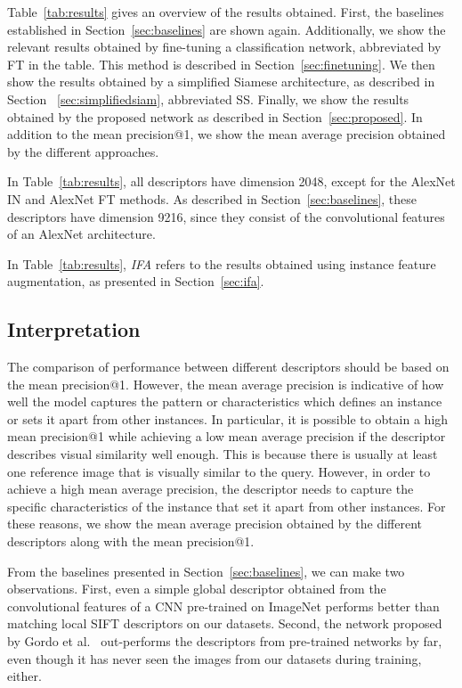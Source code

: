 Table~\ref{tab:results} gives an overview of the results obtained. First,
the baselines established in Section~\ref{sec:baselines} are shown
again. Additionally, we show the relevant results obtained by fine-tuning
a classification network, abbreviated by FT in the table. This method
is described in Section~\ref{sec:finetuning}. We then show the results
obtained by a simplified Siamese architecture, as described in Section
~\ref{sec:simplifiedsiam}, abbreviated SS. Finally, we show the results
obtained by the proposed network as described in Section~\ref{sec:proposed}.
In addition to the mean precision@1, we show the mean average
precision obtained by the different approaches.

In Table~\ref{tab:results}, all descriptors have dimension 2048, except
for the AlexNet IN and AlexNet FT methods. As described in
Section~\ref{sec:baselines}, these descriptors have dimension 9216,
since they consist of the convolutional features of an
AlexNet architecture.

In Table~\ref{tab:results}, \emph{IFA} refers to the results obtained
using instance feature augmentation, as presented in Section~\ref{sec:ifa}.

\subsection{Interpretation}
The comparison of performance between different descriptors should
be based on the mean precision@1. However, the mean average
precision is indicative of how well the model
captures the pattern or characteristics which defines an instance or
sets it apart from other instances. In particular, it is possible to obtain
a high mean precision@1 while achieving a low mean average precision
if the descriptor describes visual similarity well enough. This is because
there is usually at least one reference image that is visually similar
to the query. However, in order to achieve a high mean average precision,
the descriptor needs to capture the specific characteristics of the
instance that set it apart from other instances. For these reasons,
we show the mean average precision obtained by the different
descriptors along with the mean precision@1.

From the baselines presented in Section~\ref{sec:baselines}, we can make
two observations. First, even a simple global descriptor obtained from the
convolutional features of a CNN pre-trained on ImageNet performs better
than matching local SIFT descriptors on our datasets. Second, the network
proposed by Gordo et al.~\cite{gordo_deep_2016} out-performs the descriptors
from pre-trained networks by far, even though it has never seen the images
from our datasets during training, either.

